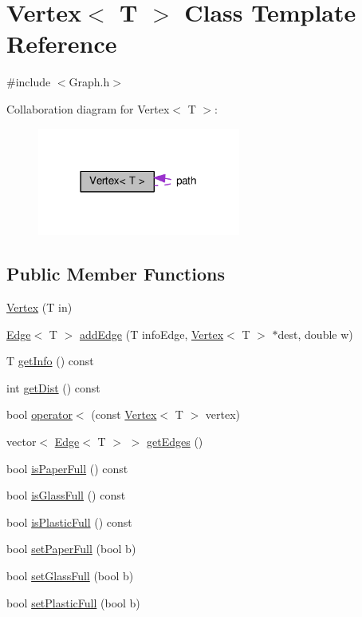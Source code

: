 \hypertarget{classVertex}{}\section{Vertex$<$ T $>$ Class Template Reference}
\label{classVertex}


{\ttfamily \#include $<$Graph.\+h$>$}



Collaboration diagram for Vertex$<$ T $>$\+:
\nopagebreak
\begin{figure}[H]
\begin{center}
\leavevmode
\includegraphics[width=189pt]{classVertex__coll__graph}
\end{center}
\end{figure}
\subsection*{Public Member Functions}
\begin{DoxyCompactItemize}
\item 
\hyperlink{classVertex_afcbdd4d4198b672356559cb8fa088408}{Vertex} (T in)
\item 
\hyperlink{classEdge}{Edge}$<$ T $>$ \hyperlink{classVertex_af36d7a9c333b841815cef357be1741d9}{add\+Edge} (T info\+Edge, \hyperlink{classVertex}{Vertex}$<$ T $>$ $\ast$dest, double w)
\item 
T \hyperlink{classVertex_a5880b4b252ae6818819c2f9645784b59}{get\+Info} () const 
\item 
int \hyperlink{classVertex_a3379c6cbcf1eaacc098381e3557a0b52}{get\+Dist} () const 
\item 
bool \hyperlink{classVertex_a7091b26f281a5041b1775a3d3f9cb7a6}{operator$<$} (const \hyperlink{classVertex}{Vertex}$<$ T $>$ vertex)
\item 
vector$<$ \hyperlink{classEdge}{Edge}$<$ T $>$ $>$ \hyperlink{classVertex_afc92f748469ed118f4a850cff31ae5b9}{get\+Edges} ()
\item 
bool \hyperlink{classVertex_ab96d7c8040c493d263993597b1cfad1f}{is\+Paper\+Full} () const 
\item 
bool \hyperlink{classVertex_aba8dc4e4450dbd6d697062ebd0ce17b1}{is\+Glass\+Full} () const 
\item 
bool \hyperlink{classVertex_a89b18f6ce97bc743e50a1552c44fa336}{is\+Plastic\+Full} () const 
\item 
bool \hyperlink{classVertex_abaa14f0eb05160c748f546a633d5f747}{set\+Paper\+Full} (bool b)
\item 
bool \hyperlink{classVertex_afb52dac3ee15e789262358e2eb13b1d1}{set\+Glass\+Full} (bool b)
\item 
bool \hyperlink{classVertex_aacb83d390255533c113c36f177ecaf51}{set\+Plastic\+Full} (bool b)
\end{DoxyCompactItemize}
